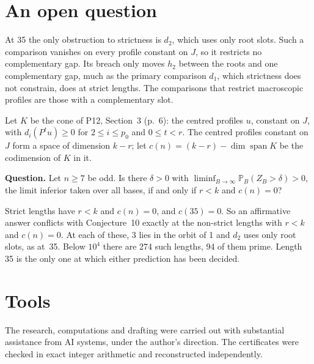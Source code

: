 \documentclass[11pt]{amsart}
\newcommand{\PP}{\mathbb{P}}
\begin{document}
\section*{An open question}
At 35 the only obstruction to strictness is \(d_2\), which uses only root slots. Such a comparison vanishes on every profile constant on \(J\), so it restricts no complementary gap. Its breach only moves \(h_2\) between the roots and one complementary gap, much as the primary comparison \(d_1\), which strictness does not constrain, does at strict lengths. The comparisons that restrict macroscopic profiles are those with a complementary slot.

Let \(K\) be the cone of P12, Section~3 (p.~6): the centred profiles \(u\), constant on \(J\), with \(d_i(P^tu)\ge0\) for \(2\le i\le p_0\) and \(0\le t<r\). The centred profiles constant on \(J\) form a space of dimension \(k-r\); let \(c(n)=(k-r)-\dim\operatorname{span}K\) be the codimension of \(K\) in it.

\medskip\noindent\textbf{Question.} Let \(n\ge7\) be odd. Is there \(\delta>0\) with \(\liminf_{B\to\infty}\PP_B(Z_B>\delta)>0\), the limit inferior taken over all bases, if and only if \(r<k\) and \(c(n)=0\)?

\medskip Strict lengths have \(r<k\) and \(c(n)=0\), and \(c(35)=0\). So an affirmative answer conflicts with Conjecture~10 exactly at the non-strict lengths with \(r<k\) and \(c(n)=0\). At each of these, 3 lies in the orbit of 1 and \(d_2\) uses only root slots, as at~35. Below \(10^4\) there are 274 such lengths, 94 of them prime. Length 35 is the only one at which either prediction has been decided.

\section*{Tools}
The research, computations and drafting were carried out with substantial assistance from AI systems, under the author's direction. The certificates were checked in exact integer arithmetic and reconstructed independently.
\end{document}
